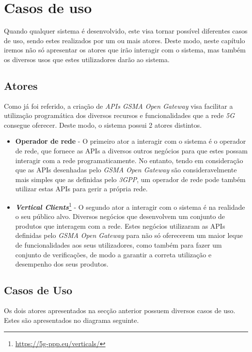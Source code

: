 \chapter{Casos de uso}

Quando qualquer sistema é desenvolvido, este visa tornar possível diferentes
casos de uso, sendo estes realizados por um ou mais atores. 
Deste modo, neste capítulo iremos não só apresentar os atores que irão
interagir com o sistema, mas também os diversos usos que estes utilizadores
darão ao sistema.

\section{Atores}

Como já foi referido, a criação de \emph{APIs GSMA Open Gateway} visa facilitar
a utilização programática dos diversos recursos e funcionalidades que a rede
\emph{5G} consegue oferecer. Deste modo, o sistema possui 2 atores distintos.
\begin{itemize} \item \textbf{Operador de rede} - O primeiro ator a interagir
	      com o sistema é o operador de rede, que fornece as APIs a diversos outros
	      negócios para que estes possam interagir com a rede programaticamente. No
	      entanto, tendo em consideração que as APIs desenhadas pelo \emph{GSMA Open
		      Gateway} são consideravelmente mais simples que as definidas pelo
	      \emph{3GPP}, um operador de rede pode também utilizar estas APIs para gerir a
	      própria rede.

	\item \textbf{\emph{Vertical
			      Clients}}\footnote{\url{https://5g-ppp.eu/verticals/}} - O segundo ator a
	      interagir com o sistema é na realidade o seu público alvo. Diversos
	      negócios que desenvolvem um conjunto de produtos que interagem com a rede.
	      Estes negócios utilizaram as APIs definidas pelo \emph{GSMA Open Gateway}
	      para não só oferecerem um maior leque de funcionalidades aos seus
	      utilizadores, como também para fazer um conjunto de verificações, de modo a
	      garantir a correta utilização e desempenho dos seus produtos. \end{itemize}

\section{Casos de Uso}

Os dois atores apresentados na secção anterior possuem diversos casos de uso.
Estes são apresentados no diagrama seguinte.

